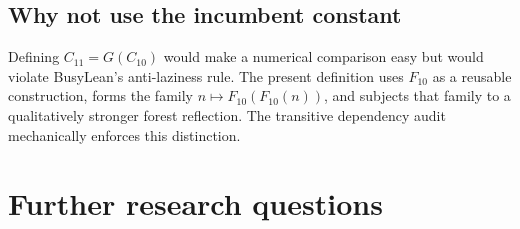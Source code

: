 \documentclass[11pt]{article}
\theoremstyle{definition}
\theoremstyle{remark}
\newcommand{\Cten}{C_{10}}
\newcommand{\Celeven}{C_{11}}
\begin{document}
\subsection{Why not use the incumbent constant}

Defining $\Celeven=G(\Cten)$ would make a numerical comparison easy but would
violate BusyLean's anti-laziness rule.  The present definition uses $F_{10}$ as
a reusable construction, forms the family $n\mapsto F_{10}(F_{10}(n))$, and
subjects that family to a qualitatively stronger forest reflection.  The
transitive dependency audit mechanically enforces this distinction.

\section{Further research questions}
\end{document}
